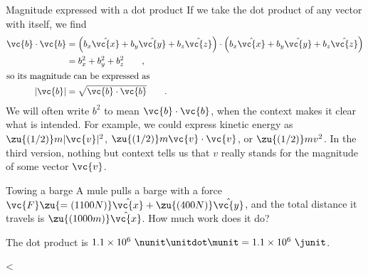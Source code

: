         \begin{eg}{Magnitude expressed with a dot product}\label{eg:magnitudedot}
        If we take the dot product of any vector  with itself, we find
        \begin{align*}        
                \vc{b}\cdot\vc{b}        &= 
                \left( b_{x}\hat{\vc{x}}+ b_{y}\hat{\vc{y}}+ b_z\hat{\vc{z}}\right)
                \cdot
                \left( b_{x}\hat{\vc{x}}+ b_{y}\hat{\vc{y}}+ b_z\hat{\vc{z}}\right) \\
                        &=  b_{x}^2+ b_{y}^2+ b_z^2 \qquad ,\\
        \intertext{so its magnitude can be expressed as}
                |\vc{b}| &= \sqrt{\vc{b}\cdot\vc{b}} \qquad .
        \end{align*}
        We will often write $b^2$ to mean $\vc{b}\cdot\vc{b}$, when the context makes it
        clear what is intended. For example, we could express kinetic energy as
        $\zu{(1/2)} m|\vc{v}|^2$, $\zu{(1/2)} m\vc{v}\cdot\vc{v}$,
        or $\zu{(1/2)} m v^2$. In the third version, nothing but context tells
        us that $v$ really stands for the magnitude of some vector $\vc{v}$.
        \end{eg}

        \begin{eg}{Towing a barge}
        \egquestion
        A mule pulls a barge with a force $\vc{F}\zu{=(1100 N)}\hat{\vc{x}}+\zu{(400 N)}\hat{\vc{y}}$,
        and the total distance it travels is $\zu{(1000 m)}\hat{\vc{x}}$. How much work does it do?

        \eganswer
        The dot product is $1.1\times10^6\ \nunit\unitdot\munit = 1.1\times10^6\ \junit$.
        \end{eg}
<%

